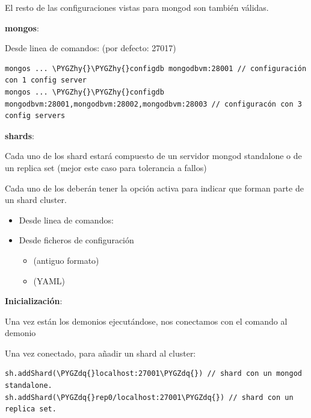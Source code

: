 \documentclass[a4paper,10pt,english]{sphinxmanual}
\def\PYGZhy{\char`\-}
\def\PYGZdq{\char`\"}
\begin{document}
El resto de las configuraciones vistas para mongod son también válidas.

\textbf{mongos}:

Desde linea de comandos:  (por defecto: 27017)

\begin{Verbatim}[commandchars=\\\{\}]
mongos ... \PYGZhy{}\PYGZhy{}configdb mongodbvm:28001 // configuración con 1 config server
mongos ... \PYGZhy{}\PYGZhy{}configdb mongodbvm:28001,mongodbvm:28002,mongodbvm:28003 // configuracón con 3 config servers
\end{Verbatim}

\textbf{shards}:

Cada uno de los shard estará compuesto de un servidor mongod standalone o de un replica set (mejor este caso para tolerancia a fallos)

Cada uno de los  deberán tener la opción  activa para indicar que forman parte de un shard cluster.
\begin{itemize}
\item {} 
Desde linea de comandos: 

\item {} 
Desde ficheros de configuración
\begin{itemize}
\item {} 
 (antiguo formato)

\item {} 
 (YAML)

\end{itemize}

\end{itemize}

\textbf{Inicialización}:

Una vez están los demonios ejecutándose, nos conectamos con el comando  al demonio 

Una vez conectado, para añadir un shard al cluster:

\begin{Verbatim}[commandchars=\\\{\}]
sh.addShard(\PYGZdq{}localhost:27001\PYGZdq{}) // shard con un mongod standalone.
sh.addShard(\PYGZdq{}rep0/localhost:27001\PYGZdq{}) // shard con un replica set.
\end{Verbatim}
\end{document}

